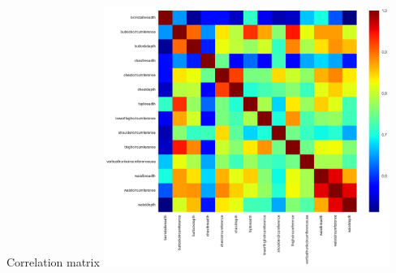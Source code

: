 \documentclass[10pt]{beamer}
\begin{document}
\begin{frame}{Correlation matrix}
	\centering
	\includegraphics[width=0.7\textwidth]{../Images/MCorr.png}
\end{frame}
\end{document}
